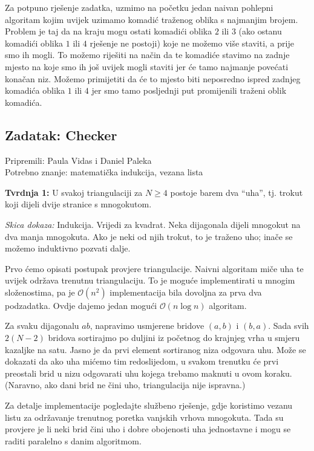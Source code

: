 \documentclass[a4paper]{article}
\begin{document}
Za potpuno rješenje zadatka, uzmimo na početku jedan naivan pohlepni algoritam
kojim uvijek uzimamo komadić traženog oblika s najmanjim brojem. Problem je taj
da na kraju mogu ostati komadići oblika $2$ ili $3$ (ako
ostanu komadići oblika $1$ ili $4$ rješenje ne postoji) koje ne možemo više
staviti, a prije smo ih mogli. To možemo riješiti na način da te komadiće
stavimo na zadnje mjesto na koje smo ih još uvijek mogli staviti jer će tamo
najmanje povećati konačan niz. Možemo primijetiti da će to mjesto biti
neposredno ispred zadnjeg komadića oblika $1$ ili $4$ jer smo tamo posljednji
put promijenili traženi oblik komadića.

\subsection*{Zadatak: Checker}
\textsf{Pripremili: Paula Vidas i Daniel Paleka}\\
\textsf{Potrebno znanje: matematička indukcija, vezana lista}

\textbf{Tvrdnja 1: } \; U svakoj triangulaciji za $N \ge 4$ postoje barem dva
``uha'', tj. trokut koji dijeli dvije stranice s mnogokutom.

\emph{Skica dokaza: } \; Indukcija. Vrijedi za kvadrat.  Neka dijagonala dijeli
mnogokut na dva manja mnogokuta. Ako je neki od njih trokut, to je traženo uho;
inače se možemo induktivno pozvati dalje.

Prvo ćemo opisati postupak provjere triangulacije.  Naivni algoritam miče uha
te uvijek održava trenutnu triangulaciju. To je moguće implementirati u mnogim
složenostima, pa je $\mathcal{O}(n^2)$ implementacija bila dovoljna za prva dva
podzadatka.  Ovdje dajemo jedan mogući $\mathcal{O}(n \log n)$ algoritam.

Za svaku dijagonalu $ab$, napravimo usmjerene bridove $(a, b)$ i $(b, a)$. Sada
svih $2(N-2)$ bridova sortirajmo po duljini iz početnog do krajnjeg vrha u
smjeru kazaljke na satu.  Jasno je da prvi element sortiranog niza odgovara
uhu. Može se dokazati da ako uha mićemo tim redoslijedom, u svakom trenutku će
prvi preostali brid u nizu odgovarati uhu kojega trebamo maknuti u ovom koraku.
(Naravno, ako dani brid ne čini uho, triangulacija nije ispravna.)

Za detalje implementacije pogledajte službeno rješenje, gdje koristimo vezanu
listu za održavanje trenutnog poretka vanjskih vrhova mnogokuta. Tada su
provjere je li neki brid čini uho i dobre obojenosti uha jednostavne i mogu se
raditi paralelno s danim algoritmom.
\end{document}

